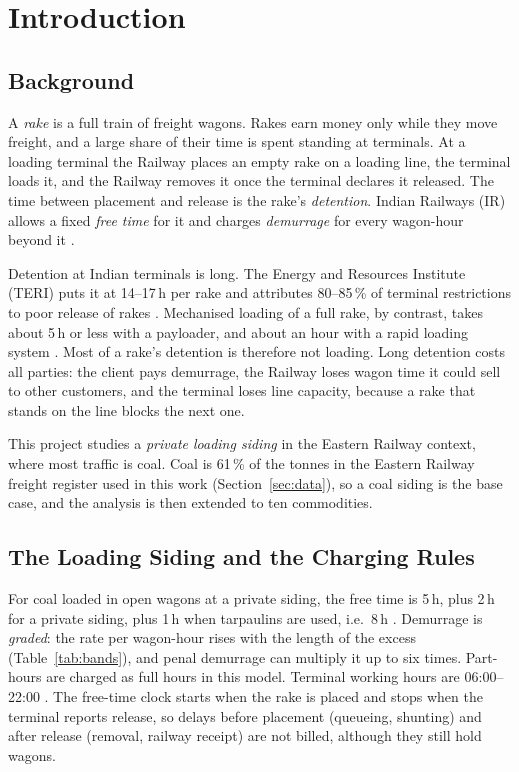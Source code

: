 \chapter{Introduction}
\label{ch:intro}

\section{Background}
\label{sec:background}
A \emph{rake} is a full train of freight wagons. Rakes earn money only while they move freight, and a large share of their time is spent standing at terminals. At a loading terminal the Railway places an empty rake on a loading line, the terminal loads it, and the Railway removes it once the terminal declares it released. The time between placement and release is the rake's \emph{detention}. Indian Railways (IR) allows a fixed \emph{free time} for it and charges \emph{demurrage} for every wagon-hour beyond it \cite{ircomp}.

Detention at Indian terminals is long. The Energy and Resources Institute (TERI) puts it at 14--17\,h per rake and attributes 80--85\,\% of terminal restrictions to poor release of rakes \cite{teri}. Mechanised loading of a full rake, by contrast, takes about 5\,h or less with a payloader, and about an hour with a rapid loading system \cite{pib}. Most of a rake's detention is therefore not loading. Long detention costs all parties: the client pays demurrage, the Railway loses wagon time it could sell to other customers, and the terminal loses line capacity, because a rake that stands on the line blocks the next one.

This project studies a \emph{private loading siding} in the Eastern Railway context, where most traffic is coal. Coal is 61\,\% of the tonnes in the Eastern Railway freight register used in this work (Section~\ref{sec:data}), so a coal siding is the base case, and the analysis is then extended to ten commodities.

\section{The Loading Siding and the Charging Rules}
\label{sec:rules}
For coal loaded in open wagons at a private siding, the free time is 5\,h, plus 2\,h for a private siding, plus 1\,h when tarpaulins are used, i.e.\ 8\,h \cite{ircomp}. Demurrage is \emph{graded}: the rate per wagon-hour rises with the length of the excess (Table~\ref{tab:bands}), and penal demurrage can multiply it up to six times. Part-hours are charged as full hours in this model. Terminal working hours are 06:00--22:00 \cite{ircomp}. The free-time clock starts when the rake is placed and stops when the terminal reports release, so delays before placement (queueing, shunting) and after release (removal, railway receipt) are not billed, although they still hold wagons.

